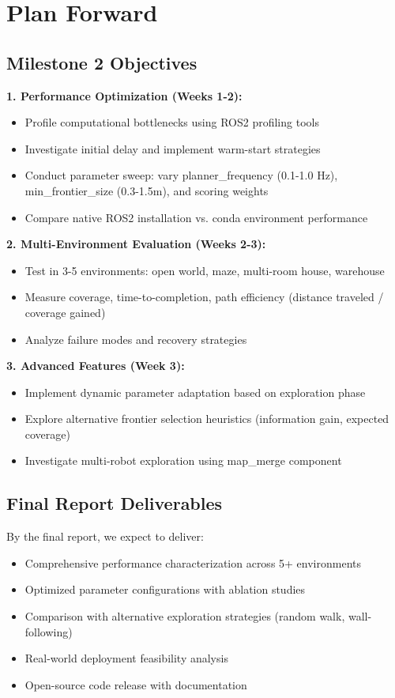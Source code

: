 \documentclass[conference]{IEEEtran}
\begin{document}
\section{Plan Forward}

\subsection{Milestone 2 Objectives}

\textbf{1. Performance Optimization (Weeks 1-2):}
\begin{itemize}
    \item Profile computational bottlenecks using ROS2 profiling tools
    \item Investigate initial delay and implement warm-start strategies
    \item Conduct parameter sweep: vary planner\_frequency (0.1-1.0 Hz), min\_frontier\_size (0.3-1.5m), and scoring weights
    \item Compare native ROS2 installation vs. conda environment performance
\end{itemize}

\textbf{2. Multi-Environment Evaluation (Weeks 2-3):}
\begin{itemize}
    \item Test in 3-5 environments: open world, maze, multi-room house, warehouse
    \item Measure coverage, time-to-completion, path efficiency (distance traveled / coverage gained)
    \item Analyze failure modes and recovery strategies
\end{itemize}

\textbf{3. Advanced Features (Week 3):}
\begin{itemize}
    \item Implement dynamic parameter adaptation based on exploration phase
    \item Explore alternative frontier selection heuristics (information gain, expected coverage)
    \item Investigate multi-robot exploration using map\_merge component
\end{itemize}

\subsection{Final Report Deliverables}

By the final report, we expect to deliver:
\begin{itemize}
    \item Comprehensive performance characterization across 5+ environments
    \item Optimized parameter configurations with ablation studies
    \item Comparison with alternative exploration strategies (random walk, wall-following)
    \item Real-world deployment feasibility analysis
    \item Open-source code release with documentation
\end{itemize}
\end{document}
